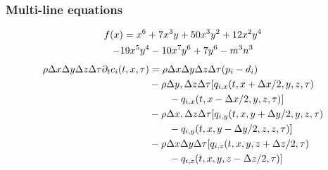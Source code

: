 \documentclass{beamer}
\begin{document}
	\begin{frame}
		\frametitle{Multi-line equations}
		\begin{multline*}
			f(x) = x^6 + 7x^3y + 50x^3y^2 + 12x^2y^4\\ 
			- 19x^5y^4 - 10x^7y^6 + 7y^6 - m^3n^3 \notag
		\end{multline*}
		\begin{equation}
			\begin{split}
				\rho \Delta x \Delta y \Delta z \Delta \tau \partial_t c_i(t,x,\tau) &= \rho \Delta x \Delta y \Delta z \Delta \tau (p_i - d_i) \\ 
				&- \rho \Delta y, \Delta z \Delta \tau [q_{i,x}(t,x + \Delta x/2, y, z, \tau ) \\
				& \quad \quad - q_{i,x}(t,x - \Delta x/2, y, z, \tau )] \\
				&- \rho \Delta x, \Delta z \Delta \tau [q_{i,y}(t,x, y + \Delta y/2, y , z, \tau ) \\
				& \quad \quad- q_{i,y}(t,x , y - \Delta y/2,z,  z, \tau )] \\
				&- \rho \Delta x \Delta y \Delta \tau [q_{i,z}(t,x, y, z + \Delta z/2, \tau ) \\
				& \quad \quad -q_{i,z}(t, x, y, z - \Delta z/2, \tau )] \notag
			\end{split}
		\end{equation}
	\end{frame}
\end{document}
